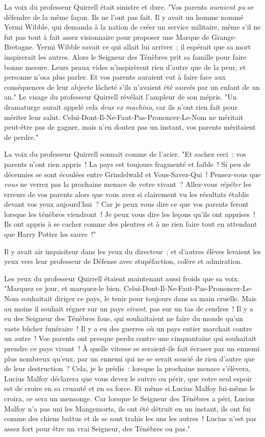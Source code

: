 La voix du professeur Quirrell était sinistre et dure. "Vos parents \emph{auraient pu} se défendre de la même façon. Ils ne l'ont pas fait. Il y avait un homme nommé Yermi Wibble, qui demanda à la nation de créer un service militaire, même s'il ne fut pas tout à fait assez visionnaire pour proposer une Marque de Grange-Bretagne. Yermi Wibble savait ce qui allait lui arriver~; il espérait que sa mort inspirerait les autres. Alors le Seigneur des Ténèbres prit sa famille pour faire bonne mesure. Leurs peaux vides n'inspirèrent rien d'autre que de la peur, et personne n'osa plus parler. Et vos parents auraient eut à faire face aux conséquences de leur abjecte lâcheté s'ils n'avaient été sauvés par un enfant de un an." Le visage du professeur Quirrell révélait l'ampleur de son mépris. "Un dramaturge aurait appelé cela \emph{deus ex machina}, car ils n'ont rien fait pour mériter leur salut. Celui-Dont-Il-Ne-Faut-Pas-Prononcer-Le-Nom ne méritait peut-être pas de gagner, mais n'en doutez pas un instant, vos parents méritaient de perdre."

La voix du professeur Quirrell sonnait comme de l'acier. "Et sachez ceci~: vos parents n'ont rien appris~! La pays est toujours fragmenté et faible~! Si peu de décennies se sont écoulées entre Grindelwald et Vous-Savez-Qui~! Pensez-vous que \emph{vous} ne verrez pas la prochaine menace de votre vivant~? Allez-vous \emph{répéter} les erreurs de vos parents alors que vous avez si clairement vu les résultats établis devant vos yeux aujourd'hui~? Car je peux vous dire ce que vos parents feront lorsque les ténèbres viendront~! Je peux vous dire les leçons qu'ils ont apprises~! Ils ont appris à se cacher comme des pleutres et à ne rien faire tout en attendant que Harry Potter les sauve~!"

Il y avait air inquisiteur dans les yeux du directeur~; et d'autres élèves levaient les yeux vers leur professeur de Défense avec stupéfaction, colère et admiration.

Les yeux du professeur Quirrell étaient maintenant aussi froids que sa voix. "Marquez ce jour, et marquez-le bien. Celui-Dont-Il-Ne-Faut-Pas-Prononcer-Le-Nom souhaitait diriger ce pays, le tenir pour toujours dans sa main cruelle. Mais au moins il souhait régner sur un pays \emph{vivant}, pas sur un tas de cendres~! Il y a eu des Seigneur des Ténèbres fous, qui souhaitaient ne faire du monde qu'un vaste bûcher funéraire~! Il y a eu des guerres où un pays entier marchait contre un autre~! Vos parents ont presque perdu contre une cinquantaine qui souhaitait prendre ce pays vivant~! À quelle vitesse se seraient-ils fait écraser par un ennemi plus nombreux qu'eux, par un ennemi qui ne se serait soucié de rien d'autre que de leur destruction~? Cela, je le prédis~: lorsque la prochaine menace s'élèvera, Lucius Malfoy déclarera que vous devez le suivre ou périr, que votre seul espoir est de croire en sa cruauté et en sa force. Et même si Lucius Malfoy lui-même le croira, ce sera un mensonge. Car lorsque le Seigneur des Ténèbres a péri, Lucius Malfoy n'a pas uni les Mangemorts, ils ont été détruit en un instant, ils ont fui comme des chiens battus et ils se sont trahis les uns les autres~! Lucius n'est pas assez fort pour être un vrai Seigneur, des Ténèbres ou pas."

